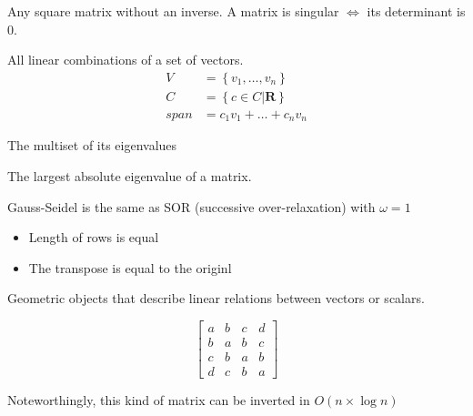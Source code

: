 \begin{definition}
    Any square matrix without an inverse.
    A matrix is singular $\iff$ its determinant is 0.

\end{definition}

\begin{definition}\label{vectorspan}
    All linear combinations of a set of vectors.
    \begin{align*}
        V &= \left\{v_{1}, \dots, v_n\right\} \\
        C &= \left\{c \in C | \mathbf{R}\right\} \\
        span &= c_{1}v_{1} + \dots + c_{n}v_{n}
    \end{align*}
\end{definition}

\begin{definition}
    The multiset of its eigenvalues
\end{definition}

\begin{definition}
    The largest absolute eigenvalue of a matrix.
\end{definition}

\begin{definition}
    Gauss-Seidel is the same as SOR (successive over-relaxation) with $\omega=1$
\end{definition}

\begin{definition}[Symmetric]
    \begin{itemize}
        \item Length of rows is equal
        \item The transpose is equal to the originl
    \end{itemize}
\end{definition}

\begin{definition}[Tensor]
    Geometric objects that describe linear relations between vectors or scalars.
\end{definition}

\begin{definition}
    $$
    \begin{bmatrix}
    a & b & c & d \\
    b & a & b & c \\
    c & b & a & b \\
    d & c & b & a
    \end{bmatrix}
    $$

    Noteworthingly, this kind of matrix can be inverted in $O(n \times \log{n})$
\end{definition}

